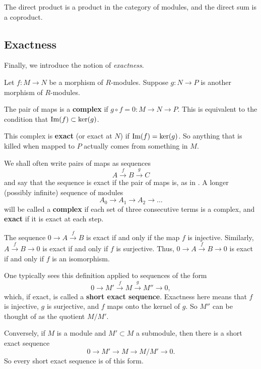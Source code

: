 \begin{exercise} 
The direct product is a product in the category of modules, and the direct sum
is a coproduct.
\end{exercise} 


\subsection{Exactness}
Finally, we introduce the notion of \emph{exactness}. 
\begin{definition} \label{exactness}
Let $f: M \to N$ be a morphism of $R$-modules.  Suppose $g: N \to P$ is another morphism of
$R$-modules.  

The pair of maps is a \textbf{complex} if $g \circ f = 0: M \to N \to P$.
This is equivalent to the condition that $\operatorname{Im}(f) \subset \ker(g)$. 

This complex is \textbf{exact} (or exact at $N$) if $\operatorname{Im}(f) = \ker(g)$. So
anything that is killed when mapped to $P$ actually comes from something in
$M$. 

\end{definition} 


We shall often write pairs of maps as sequences
\[ A \stackrel{f}{\to} B \stackrel{g}{\to} C  \]
and say that the sequence is exact if the pair of maps is, as in
. A longer (possibly infinite) sequence of modules
\[ A_0 \to A_1 \to A_2 \to \dots  \]
will be called a \textbf{complex} if each set of three
consecutive terms is a complex, and \textbf{exact} if it is exact at each step.

\begin{example} 
The sequence $0 \to A \stackrel{f}{\to} B$ is exact if and only if the map $f$
is injective. Similarly, $A \stackrel{f}{\to} B \to 0$ is exact if and only if
$f$ is surjective. Thus, $0 \to A \stackrel{f}{\to}  B \to 0$ is exact if and
only if $f$ is an isomorphism.
\end{example} 

One typically sees this definition applied to sequences of the form
\[ 0 \to M'\stackrel{f}{ \to} M \stackrel{g}{\to} M'' \to 0,  \]
which, if exact, is called a \textbf{short exact sequence}. 
Exactness here means that $f$ is injective, $g$ is surjective, and $f$ maps
onto the kernel of $g$.  So $M''$ can be thought of as the quotient $M/M'$.

\begin{example} 
Conversely, if $M$ is a module and $M' \subset M$ a submodule, then there is a
short exact sequence
\[ 0 \to M' \to M \to M/M' \to 0.  \]
So every short exact sequence is of this form.
\end{example} 


